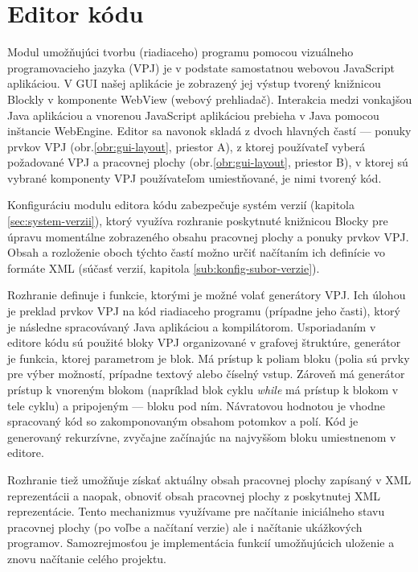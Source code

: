 \section{Editor kódu}
\label{sec:editor-kodu}
Modul umožňujúci tvorbu (riadiaceho) programu pomocou vizuálneho programovacieho jazyka (VPJ) je v podstate samostatnou webovou JavaScript aplikáciou. V GUI našej aplikácie je zobrazený jej výstup tvorený knižnicou Blockly v komponente WebView (webový prehliadač). Interakcia medzi vonkajšou Java aplikáciou a vnorenou JavaScript aplikáciou prebieha v Java pomocou inštancie WebEngine. Editor sa navonok skladá z dvoch hlavných častí --- ponuky prvkov VPJ (obr.\ref{obr:gui-layout}, priestor A), z ktorej používateľ vyberá požadované  VPJ a pracovnej plochy (obr.\ref{obr:gui-layout}, priestor B), v ktorej sú vybrané komponenty VPJ používateľom umiestňované, je nimi tvorený kód.

Konfiguráciu modulu editora kódu zabezpečuje systém verzií (kapitola \ref{sec:system-verzii}), ktorý využíva rozhranie poskytnuté knižnicou Blocky pre úpravu momentálne zobrazeného obsahu pracovnej plochy a ponuky prvkov VPJ. Obsah a rozloženie oboch týchto častí možno určiť načítaním ich definície vo formáte XML (súčasť verzií, kapitola \ref{sub:konfig-subor-verzie}).

Rozhranie definuje i funkcie, ktorými je možné volať generátory VPJ. Ich úlohou je preklad prvkov VPJ na kód riadiaceho programu (prípadne jeho časti), ktorý je následne spracovávaný Java aplikáciou a kompilátorom. Usporiadaním v editore kódu sú použité bloky VPJ organizované v grafovej štruktúre, generátor je funkcia, ktorej parametrom je blok. Má prístup k poliam bloku (polia sú prvky pre výber možností, prípadne textový alebo číselný vstup. Zároveň má generátor prístup k vnoreným blokom (napríklad blok cyklu \textit{while} má prístup k blokom v tele cyklu) a pripojeným  --- bloku pod ním. Návratovou hodnotou je vhodne spracovaný kód so zakomponovaným obsahom potomkov a polí. Kód je generovaný rekurzívne, zvyčajne začínajúc na najvyššom bloku umiestnenom v editore.

Rozhranie tiež umožňuje získať aktuálny obsah pracovnej plochy zapísaný v XML reprezentácii a naopak, obnoviť obsah pracovnej plochy z poskytnutej XML reprezentácie. Tento mechanizmus využívame pre načítanie iniciálneho stavu pracovnej plochy (po voľbe a načítaní verzie) ale i načítanie ukážkových programov. Samozrejmosťou je implementácia funkcií umožňujúcich uloženie a znovu načítanie celého projektu.

